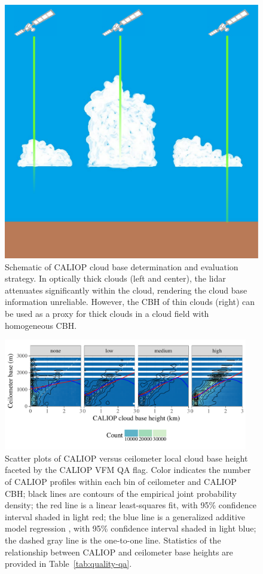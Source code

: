 \documentclass[essd,manuscript]{copernicus}\usepackage[]{graphicx}\usepackage[]{color}
\newenvironment{knitrout}{}{} %
\begin{document}
\begin{figure}
  \centering
  \includegraphics[width=0.5\linewidth,keepaspectratio=true]{CloudFieldCALIOP.pdf}
  \caption{Schematic of CALIOP cloud base determination and evaluation strategy.
    In optically thick clouds (left and center), the lidar attenuates
    significantly within the cloud, rendering the cloud base information
    unreliable.  However, the CBH of thin clouds (right) can be used as a proxy
    for thick clouds in a cloud field with homogeneous CBH.}
  \label{fig:method}
\end{figure}

\begin{figure}
  \centering
\begin{knitrout}
\color{fgcolor}

{\centering \includegraphics[width=0.95\textwidth]{figure/method-eval-qual-1} 

}



\end{knitrout}
  \caption{Scatter plots of CALIOP versus ceilometer local cloud base height
    faceted by the CALIOP VFM QA flag.  Color indicates the number of CALIOP
    profiles within each bin of ceilometer and CALIOP CBH; black
    lines are contours of the empirical joint probability density; the red line
    is a linear least-squares fit, with 95\% confidence interval shaded in light
    red; the blue line is a generalized additive model regression
    \citep{Wood2011}, with 95\% confidence interval shaded in light
    blue; the dashed gray line is the one-to-one line.  Statistics of the
    relationship between CALIOP and ceilometer base heights are provided in
    Table~\ref{tab:quality-qa}.}
  \label{fig:quality-qa}
\end{figure}
\end{document}
